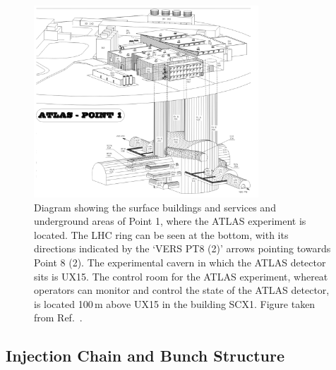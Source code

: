 \begin{figure}[!htb]
    \begin{center}
        \includegraphics[width=0.75\textwidth]{figures/chapter2/point1_illustration}
        \caption{
            Diagram showing the surface buildings and services and underground areas of Point 1, where
            the ATLAS experiment is located. The LHC ring can be seen at the bottom,
            with its directions indicated by the `VERS PT8 (2)' arrows pointing
            towards Point 8 (2).
            The experimental cavern in which the ATLAS detector sits is UX15.
            The control room for the ATLAS experiment, whereat operators can monitor and
            control the state of the ATLAS detector, is located 100\,m above
            UX15 in the building SCX1.
            Figure taken from Ref.~\cite{LHCDesignII}.
        }
        \label{fig:p1}
    \end{center}
\end{figure}

\subsection{Injection Chain and Bunch Structure}
\label{sec:lhc_injection}

